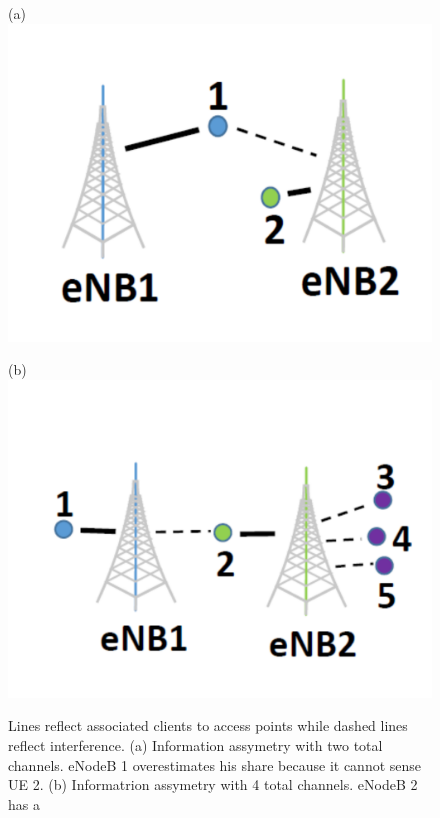 \begin{figure}[htb!]
  \begin{minipage}{0.23\textwidth}
    \centering
    (a)
    \vfill
    \includegraphics[width=\textwidth,height=0.6\columnwidth]{./figs/over.pdf}
  \end{minipage}
  \begin{minipage}{0.23\textwidth}
    \centering
    (b)
    \vfill
  \includegraphics[width=\textwidth,height=0.6\columnwidth]{./figs/under.pdf}
  \end{minipage}
  \hfill
  \caption{Lines reflect associated clients to access points while dashed lines reflect interference. (a) Information assymetry with two total channels. eNodeB 1 overestimates his share because it cannot sense UE 2. (b) Informatrion assymetry with 4 total channels. eNodeB 2 has a
}
\end{figure}
